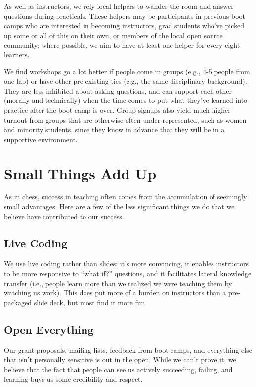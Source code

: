 \documentclass{article}
\begin{document}
As well as instructors, we rely local helpers to wander the room and
answer questions during practicals. These helpers may be participants in
previous boot camps who are interested in becoming instructors, grad
students who've picked up some or all of this on their own, or members
of the local open source community; where possible, we aim to have at
least one helper for every eight learners.

We find workshops go a lot better if people come in groups (e.g., 4-5
people from one lab) or have other pre-existing ties (e.g., the same
disciplinary background). They are less inhibited about asking
questions, and can support each other (morally and technically) when the
time comes to put what they've learned into practice after the boot camp
is over. Group signups also yield much higher turnout from groups that
are otherwise often under-represented, such as women and minority
students, since they know in advance that they will be in a supportive
environment.

\section{Small Things Add Up}

As in chess, success in teaching often comes from the accumulation of
seemingly small advantages. Here are a few of the less significant
things we do that we believe have contributed to our success.

\subsection{Live Coding}

We use live coding rather than slides: it's more convincing, it enables
instructors to be more responsive to ``what if?'' questions, and it
facilitates lateral knowledge transfer (i.e., people learn more than we
realized we were teaching them by watching us work). This does put more
of a burden on instructors than a pre-packaged slide deck, but most find
it more fun.

\subsection{Open Everything}

Our grant proposals, mailing lists, feedback from boot camps, and
everything else that isn't personally sensitive is out in the open.
While we can't prove it, we believe that the fact that people can see us
actively succeeding, failing, and learning buys us some credibility and
respect.
\end{document}
